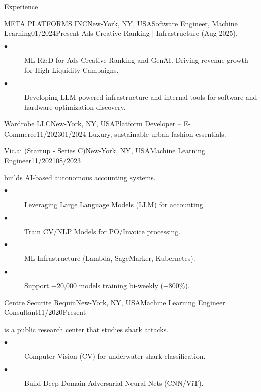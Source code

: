 \documentclass{resume}
\begin{document}
\begin{multicols}{2}
\begin{rSection}{\Large Experience}
		\begin{job}{META PLATFORMS INC}{New-York, NY, USA}{Software Engineer, Machine Learning}{01/2024}{Present}{
			 Ads Creative Ranking |  Infrastructure (Aug 2025).
		}
            \begin{description}
			\item[$\bullet$] ML R\&D for Ads Creative Ranking and GenAI. Driving revenue growth for High Liquidity Campaigns.
                \item[$\bullet$] Developing LLM-powered infrastructure and internal tools for software and hardware optimization discovery.
			\end{description}
		\end{job}

  
		\begin{job}{Wardrobe LLC}{New-York, NY, USA}{Platform Developer – E-Commerce}{11/2023}{01/2024}{
			Luxury, sustainable urban fashion essentials.
		}
		\end{job}


		\begin{job}{Vic.ai (Startup - Series C)}{New-York, NY, USA}{Machine Learning Engineer}{11/2021}{08/2023}{
			builds AI-based autonomous accounting systems.
			\begin{description}
				\item[$\bullet$] Leveraging Large Language Models (LLM) for accounting.
				\item[$\bullet$] Train CV/NLP Models for PO/Invoice processing.
				\item[$\bullet$] ML Infrastructure (Lambda, SageMarker, Kubernetes).
				\item[$\bullet$] Support +20,000 models training bi-weekly (+800\%).
			\end{description}
		}
		\end{job}

		\begin{job}{Centre Securite Requin}{New-York, NY, USA}{Machine Learning Engineer Consultant}{11/2020}{Present}{
			is a public research center that studies shark attacks.
			\begin{description}
				\item[$\bullet$] Computer Vision (CV) for underwater shark classification.
				\item[$\bullet$] Build Deep Domain Adversarial Neural Nets  (CNN/ViT).
			\end{description}
		}
		\end{job}


\end{rSection}
\end{multicols}
\end{document}
